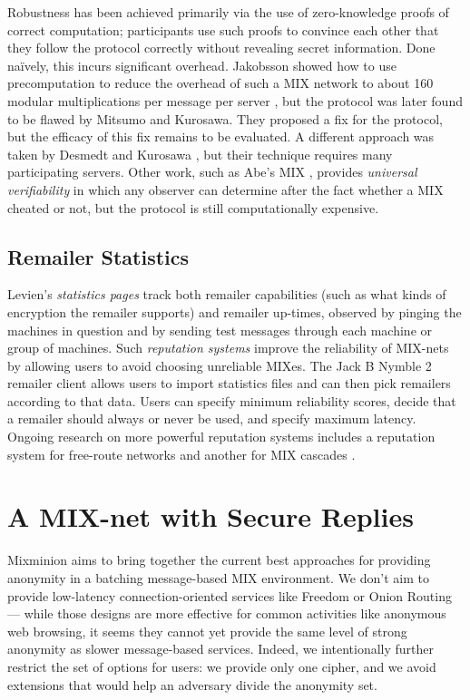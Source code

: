 \documentclass{llncs}
\begin{document}
Robustness has been achieved primarily via the use of zero-knowledge
proofs of correct computation; participants use such proofs to convince
each other that they follow the protocol correctly without revealing secret
information. Done na\"{\a i}vely, this incurs significant
overhead. 
Jakobsson showed how to use precomputation to reduce the overhead of
such a MIX network to about 160 modular multiplications
per message per server \cite{flash-mix}, but the protocol was later
found to be flawed \cite{mitkuro} by Mitsumo and Kurosawa. They
proposed a fix for the protocol, but the efficacy of this fix remains
to be evaluated.  A different approach was taken by Desmedt and
Kurosawa \cite{desmedt}, but their technique requires many
participating servers. Other work, such as Abe's MIX \cite{abe},
provides \emph{universal verifiability} in which any observer can
determine after the fact whether a MIX cheated or not, but
the protocol is still computationally expensive.

\subsection{Remailer Statistics}

Levien's \emph{statistics pages} \cite{levien} track both remailer
capabilities (such as what kinds of encryption the remailer supports)
and remailer up-times, observed by pinging the machines in question
and by sending test messages through each machine or group of machines.
Such \emph{reputation systems} improve the reliability of MIX-nets by
allowing users to avoid choosing unreliable MIXes. The Jack B Nymble 2
remailer client \cite{potato} allows users to import statistics files
and can then pick remailers according to that data. Users can specify
minimum reliability scores, decide that a remailer should always or never
be used, and specify maximum latency. Ongoing research on more powerful
reputation systems includes a reputation system for free-route networks
\cite{mix-acc} and another for MIX cascades \cite{casc-rep}.


\section{A MIX-net with Secure Replies}
\label{sec:design}

Mixminion aims to bring together the current best approaches for providing
anonymity in a batching message-based MIX environment. We don't aim
to provide low-latency connection-oriented services like Freedom
\cite{freedom} or Onion Routing \cite{goldschlag99} --- while those
designs are more effective for common activities like anonymous web
browsing, it seems they cannot yet provide the same level of strong
anonymity as slower message-based services. Indeed, we intentionally
further restrict the set of options for users: we provide only one
cipher, and we avoid extensions that would help an adversary divide the
anonymity set.
\end{document}
